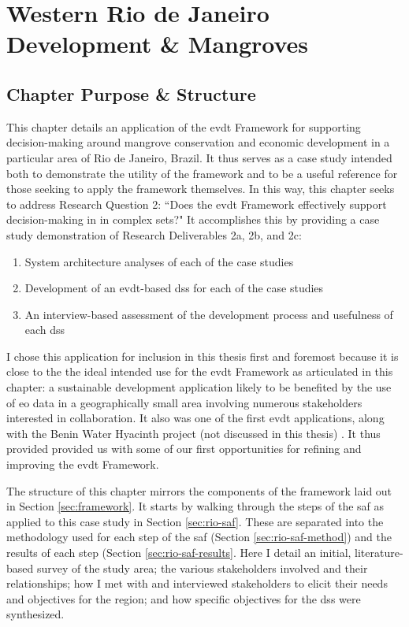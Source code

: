 \chapter{Western Rio de Janeiro Development \& Mangroves} \label{ch:mangroves}

\section{Chapter Purpose \& Structure}

This chapter details an application of the \acf{evdt} Framework for supporting decision-making around mangrove conservation and economic development in a particular area of Rio de Janeiro, Brazil. It thus serves as a case study intended both to demonstrate the utility of the framework and to be a useful reference for those seeking to apply the framework themselves. In this way, this chapter seeks to address Research Question 2: ``Does the \ac{evdt} Framework effectively support decision-making in in complex \ac{sets}?" It accomplishes this by providing a case study demonstration of Research Deliverables 2a, 2b, and 2c: 

\begin{enumerate}[label=\emph{\alph*},itemsep=0pt,parsep=0pt]
	\item{System architecture analyses of each of the case studies} 
	\item{Development of an \ac{evdt}-based \acf{dss} for each of the case studies} 
	\item{An interview-based assessment of the development process and usefulness of each \ac{dss}} 
\end{enumerate}

I chose this application for inclusion in this thesis first and foremost because it is close to the the ideal intended use for the \ac{evdt} Framework as articulated in this chapter: a sustainable development application likely to be benefited by the use of \acf{eo} data in a geographically small area involving numerous stakeholders interested in collaboration. It also was one of the first \ac{evdt} applications, along with the Benin Water Hyacinth project (not discussed in this thesis) \cite{ovienmhadaEarthObservationTechnology2020, ovienmhadaInclusiveDesignEarth2021}. It thus provided provided us with some of our first opportunities for refining and improving the \ac{evdt} Framework.
	
The structure of this chapter mirrors the components of the framework laid out in Section \ref{sec:framework}. It starts by walking through the steps of the \acf{saf} as applied to this case study in Section \ref{sec:rio-saf}. These are separated into the methodology used for each step of the \ac{saf} (Section \ref{sec:rio-saf-method}) and the results of each step (Section \ref{sec:rio-saf-results}. Here I detail an initial, literature-based survey of the study area; the various stakeholders involved and their relationships; how I met with and interviewed stakeholders to elicit their needs and objectives for the region; and how specific objectives for the \ac{dss} were synthesized. 

